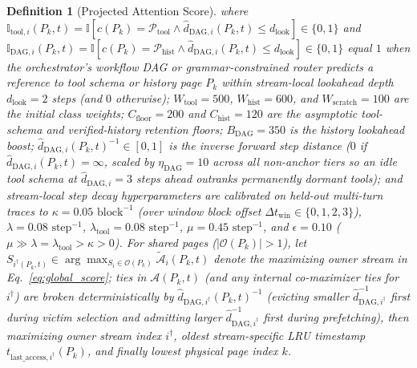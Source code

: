 \documentclass[conference,10pt]{IEEEtran}
\newtheorem{definition}{Definition}
\begin{document}
\begin{definition}[Projected Attention Score]
where $\mathbb{I}_{\text{tool},i}(P_k, t) = \mathbb{I}[c(P_k)=\mathcal{P}_{\text{tool}} \wedge \hat{d}_{\text{DAG},i}(P_k, t) \le d_{\text{look}}] \in \{0, 1\}$ and $\mathbb{I}_{\text{DAG},i}(P_k, t) = \mathbb{I}[c(P_k)=\mathcal{P}_{\text{hist}} \wedge \hat{d}_{\text{DAG},i}(P_k, t) \le d_{\text{look}}] \in \{0, 1\}$ equal $1$ when the orchestrator's workflow DAG or grammar-constrained router predicts a reference to tool schema or history page $P_k$ within stream-local lookahead depth $d_{\text{look}} = 2$ steps (and $0$ otherwise); $W_{\text{tool}} = 500$, $W_{\text{hist}} = 600$, and $W_{\text{scratch}} = 100$ are the initial class weights; $C_{\text{floor}} = 200$ and $C_{\text{hist}} = 120$ are the asymptotic tool-schema and verified-history retention floors; $B_{\text{DAG}} = 350$ is the history lookahead boost; $\hat{d}_{\text{DAG},i}(P_k, t)^{-1} \in [0, 1]$ is the inverse forward step distance ($0$ if $\hat{d}_{\text{DAG},i}(P_k, t) = \infty$, scaled by $\eta_{\text{DAG}} = 10$ across all non-anchor tiers so an idle tool schema at $\hat{d}_{\text{DAG},i} = 3$ steps ahead outranks permanently dormant tools); and stream-local step decay hyperparameters are calibrated on held-out multi-turn traces to $\kappa = 0.05\text{ block}^{-1}$ (over window block offset $\Delta t_{\text{win}} \in \{0, 1, 2, 3\}$), $\lambda = 0.08\text{ step}^{-1}$, $\lambda_{\text{tool}} = 0.08\text{ step}^{-1}$, $\mu = 0.45\text{ step}^{-1}$, and $\epsilon = 0.10$ ($\mu \gg \lambda = \lambda_{\text{tool}} > \kappa > 0$). For shared pages ($|\mathcal{O}(P_k)| > 1$), let $S_{i^\dagger(P_k, t)} \in \arg\max_{S_i \in \mathcal{O}(P_k)} \tilde{\mathcal{A}}_i(P_k, t)$ denote the maximizing owner stream in Eq.~\eqref{eq:global_score}; ties in $\mathcal{A}(P_k, t)$ (and any internal co-maximizer ties for $i^\dagger$) are broken deterministically by $\hat{d}_{\text{DAG},i^\dagger}(P_k, t)^{-1}$ (evicting smaller $\hat{d}_{\text{DAG},i^\dagger}^{-1}$ first during victim selection and admitting larger $\hat{d}_{\text{DAG},i^\dagger}^{-1}$ first during prefetching), then maximizing owner stream index $i^\dagger$, oldest stream-specific LRU timestamp $t_{\text{last\_access},i^\dagger}(P_k)$, and finally lowest physical page index $k$.
\end{definition}
\end{document}
